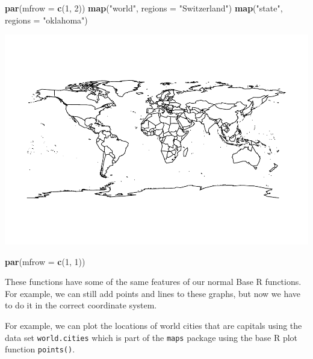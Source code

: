 \documentclass[
]{book}
\newenvironment{Shaded}{\begin{snugshade}}{\end{snugshade}}
\newcommand{\DataTypeTok}[1]{\textcolor[rgb]{0.13,0.29,0.53}{#1}}
\newcommand{\DecValTok}[1]{\textcolor[rgb]{0.00,0.00,0.81}{#1}}
\newcommand{\KeywordTok}[1]{\textcolor[rgb]{0.13,0.29,0.53}{\textbf{#1}}}
\newcommand{\NormalTok}[1]{#1}
\newcommand{\OperatorTok}[1]{\textcolor[rgb]{0.81,0.36,0.00}{\textbf{#1}}}
\newcommand{\StringTok}[1]{\textcolor[rgb]{0.31,0.60,0.02}{#1}}
\begin{document}
\begin{Shaded}
\begin{Highlighting}[]
\KeywordTok{par}\NormalTok{(}\DataTypeTok{mfrow =} \KeywordTok{c}\NormalTok{(}\DecValTok{1}\NormalTok{, }\DecValTok{2}\NormalTok{))}
\KeywordTok{map}\NormalTok{(}\StringTok{"world"}\NormalTok{, }\DataTypeTok{regions =} \StringTok{"Switzerland"}\NormalTok{)}
\KeywordTok{map}\NormalTok{(}\StringTok{"state"}\NormalTok{, }\DataTypeTok{regions =} \StringTok{"oklahoma"}\NormalTok{)}
\end{Highlighting}
\end{Shaded}

\includegraphics{_main_files/figure-latex/unnamed-chunk-194-1.pdf}

\begin{Shaded}
\begin{Highlighting}[]
\KeywordTok{par}\NormalTok{(}\DataTypeTok{mfrow =} \KeywordTok{c}\NormalTok{(}\DecValTok{1}\NormalTok{, }\DecValTok{1}\NormalTok{))}
\end{Highlighting}
\end{Shaded}

These functions have some of the same features of our normal Base R functions. For example, we can still add points and lines to these graphs, but now we have to do it in the correct coordinate system.

For example, we can plot the locations of world cities that are capitals using the data set \texttt{world.cities} which is part of the \texttt{maps} package using the base R plot function \texttt{points()}.

\begin{Shaded}
\end{Shaded}
\end{document}
